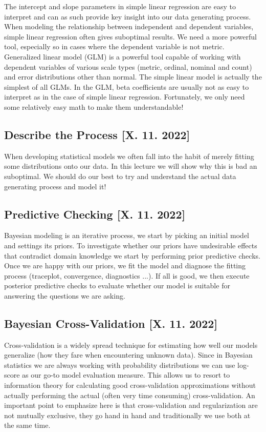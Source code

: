\documentclass[fleqn,moreauthors,10pt]{ds_report}
\begin{document}
The intercept and slope parameters in simple linear regression are easy to interpret and can as such provide key insight into our data generating process. When modeling the relationship between independent and dependent variables, simple linear regression often gives suboptimal results. We need a more powerful tool, especially so in cases where the dependent variable is not metric. Generalized linear model (GLM) is a powerful tool capable of working with dependent variables of various scale types (metric, ordinal, nominal and count) and error distributions other than normal. The simple linear model is actually the simplest of all GLMs. In the GLM, beta coefficients are usually not as easy to interpret as in the case of simple linear regression. Fortunately, we only need some relatively easy math to make them understandable!

\subsection*{Describe the Process [X. 11. 2022]}

When developing statistical models we often fall into the habit of merely fitting some distributions onto our data. In this lecture we will show why this is bad an suboptimal. We should do our best to try and understand the actual data generating process and model it!

\subsection*{Predictive Checking [X. 11. 2022]}

Bayesian modeling is an iterative process, we start by picking an initial model and settings its priors. To investigate whether our priors have undesirable effects that contradict domain knowledge we start by performing prior predictive checks. Once we are happy with our priors, we fit the model and diagnose the fitting process (traceplot, convergence, diagnostics ...). If all is good, we then execute posterior predictive checks to evaluate whether our model is suitable for answering the questions we are asking.

\subsection*{Bayesian Cross-Validation [X. 11. 2022]}

Cross-validation is a widely spread technique for estimating how well our models generalize (how they fare when encountering unknown data). Since in Bayesian statistics we are always working with probability distributions we can use log-score as our go-to model evaluation measure. This allows us to resort to information theory for calculating good cross-validation approximations without actually performing the actual (often very time consuming) cross-validation. An important point to emphasize here is that cross-validation and regularization are not mutually exclusive, they go hand in hand and traditionally we use both at the same time.
\end{document}
